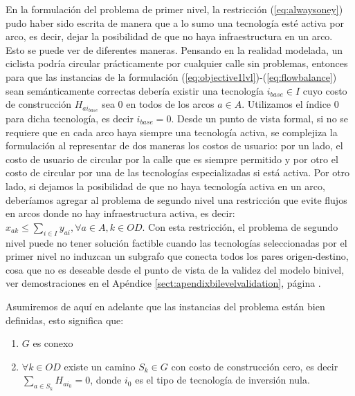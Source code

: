 En la formulación del problema de primer nivel, la restricción (\ref{eq:alwaysoney}) pudo haber sido escrita de manera que a lo sumo una tecnología esté activa por arco, es decir, dejar la posibilidad de que no haya infraestructura en un arco. Esto se puede ver de diferentes maneras. Pensando en la realidad modelada, un ciclista podría circular prácticamente por cualquier calle sin problemas, entonces para que las instancias de la formulación (\ref{eq:objective1lvl})-(\ref{eq:flowbalance}) sean semánticamente correctas debería existir una tecnología $i_{base} \in I$ cuyo costo de construcción $H_{ai_{base}}$ sea 0 en todos de los arcos $a \in A$. Utilizamos el índice 0 para dicha tecnología, es decir $i_{base} = 0$. Desde un punto de vista formal, si no se requiere que en cada arco haya siempre una tecnología activa, se complejiza la formulación al representar de dos maneras los costos de usuario: por un lado, el costo de usuario de circular por la calle que es siempre permitido y por otro el costo de circular por una de las tecnologías especializadas si está activa. Por otro lado, si dejamos la posibilidad de que no haya tecnología activa en un arco, deberíamos agregar al problema de segundo nivel una restricción que evite flujos en arcos donde no hay infraestructura activa, es decir: $x_{ak} \leq \sum_{i \in I} y_{ai}, \forall a \in A, k \in OD$. Con esta restricción, el problema de segundo nivel puede no tener solución factible cuando las tecnologías seleccionadas por el primer nivel no induzcan un subgrafo que conecta todos los pares origen-destino, cosa que no es deseable desde el punto de vista de la validez del modelo binivel, ver demostraciones en el Apéndice \ref{sect:apendixbilevelvalidation}, página \pageref{sect:apendixbilevelvalidation}.

Asumiremos de aquí en adelante que las instancias del problema están bien definidas, esto significa que:

\begin{enumerate}
  \item {$G$ es conexo}
  \item {$\forall k \in OD$ existe un camino $S_k \in G$ con costo de construcción cero, es decir $\sum_{a \in S_k} H_{ai_0} = 0$}, donde $i_0$ es el tipo de tecnología de inversión nula.
\end{enumerate}


